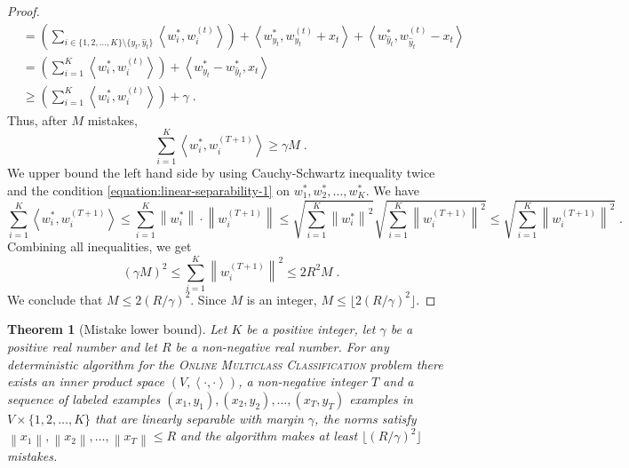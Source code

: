 \documentclass[12pt]{article}
\newtheorem{theorem}[definition]{Theorem}
\newcommand{\ip}[2]{\left\langle #1, #2 \right\rangle} %
\newcommand{\norm}[1]{\left\| #1 \right\|}  %
\begin{document}
\begin{proof}
\begin{align*}
& = \left( \sum_{i \in \{1,2,\dots,K\} \setminus \{y_t, \widehat y_t\}} \ip{w_i^*}{w_i^{(t)}} \right) + \ip{w_{y_t}^*}{w_{y_t}^{(t)} + x_t} + \ip{w_{\widehat y_t}^*}{w_{\widehat y_t}^{(t)} - x_t} \\
& = \left( \sum_{i=1}^K \ip{w_i^*}{w_i^{(t)}} \right) + \ip{w_{y_t}^* - w_{\widehat y_t}^*}{x_t} \\
& \ge  \left( \sum_{i=1}^K \ip{w_i^*}{w_i^{(t)}} \right) + \gamma \; .
\end{align*}
Thus, after $M$ mistakes,
$$
\sum_{i=1}^K \ip{w_i^*}{w_i^{(T+1)}} \ge \gamma M \; .
$$
We upper bound the left hand side by using Cauchy-Schwartz inequality twice and
the condition \eqref{equation:linear-separability-1} on $w_1^*, w_2^*, \dots,
w_K^*$. We have
$$
\sum_{i=1}^K \ip{w_i^*}{w_i^{(T+1)}}
\le \sum_{i=1}^K \norm{w_i^*} \cdot \norm{w_i^{(T+1)}}
\le \sqrt{\sum_{i=1}^K \norm{w_i^*}^2} \sqrt{\sum_{i=1}^K \norm{w_i^{(T+1)}}^2}
\le \sqrt{\sum_{i=1}^K \norm{w_i^{(T+1)}}^2} \; .
$$
Combining all inequalities, we get
$$
(\gamma M)^2 \le \sum_{i=1}^K \norm{w_i^{(T+1)}}^2 \le 2R^2 M \; .
$$
We conclude that $M \le 2(R/\gamma)^2$. Since $M$ is an integer, $M \le \lfloor 2(R/\gamma)^2 \rfloor$.
\end{proof}


\begin{theorem}[Mistake lower bound]
\label{theorem:online-multiclass-classification-mistake-lower-bound}
Let $K$ be a positive integer, let $\gamma$ be a positive real number and let
$R$ be a non-negative real number. For any deterministic algorithm for the
\textsc{Online Multiclass Classification} problem there exists an
inner product space $(V, \ip{\cdot}{\cdot})$, a non-negative integer $T$ and a
sequence of labeled examples $(x_1, y_1), (x_2, y_2), \dots, (x_T, y_T)$
examples in $V \times \{1,2,\dots,K\}$ that are linearly separable with margin
$\gamma$, the norms satisfy $\norm{x_1}, \norm{x_2}, \dots, \norm{x_T} \le R$
and the algorithm makes at least $\lfloor (R/\gamma)^2 \rfloor$ mistakes.
\end{theorem}
\end{document}
